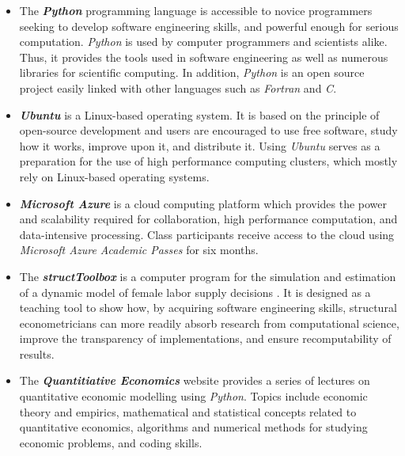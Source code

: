 \begin{itemize}
\item  The \textbf{\textit{Python}}  programming language is accessible to novice programmers seeking to develop software engineering skills, and powerful enough for serious computation. \textit{Python} is used by computer programmers and scientists alike. Thus, it provides the tools used in software engineering as well as numerous libraries for scientific computing. In addition, \textit{Python} is an open source project easily linked with other languages such as \textit{Fortran} and \textit{C}. 
\item \textbf{\textit{Ubuntu}} is a Linux-based operating system. It is based on the principle of open-source development and users are encouraged to use free software, study how it works, improve upon it, and distribute it. Using \textit{Ubuntu} serves as a preparation for the use of high performance computing clusters, which mostly rely on Linux-based operating systems.
\item \textbf{\textit{Microsoft Azure}}  is a cloud computing platform which provides the power and scalability required for collaboration, high performance computation, and data-intensive processing. Class participants receive access to the cloud using \textit{Microsoft Azure Academic Passes} for six months.
\item The \textbf{\textit{structToolbox}} is a computer program for the simulation and estimation of a dynamic model of female labor supply  decisions \citep{Keane.2011d}. It is designed as a teaching tool to show how, by acquiring software engineering skills, structural econometricians can more readily absorb research from computational science, improve the transparency of implementations, and ensure recomputability of results.
\item The \textbf{\textit{Quantitiative Economics}} website provides a series of lectures on quantitative economic modelling using \textit{Python}. Topics include economic theory and empirics, mathematical and statistical concepts related to quantitative economics, algorithms and numerical methods for studying economic problems, and coding skills.
\end{itemize}
